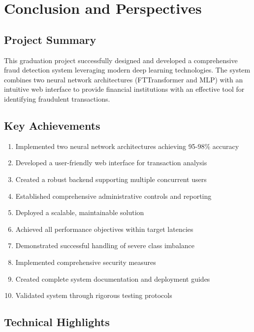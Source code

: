 \documentclass[12pt,a4paper,twoside]{report}
\begin{document}
\chapter*{Conclusion and Perspectives}

\section*{Project Summary}

This graduation project successfully designed and developed a comprehensive fraud detection system leveraging modern deep learning technologies. The system combines two neural network architectures (FTTransformer and MLP) with an intuitive web interface to provide financial institutions with an effective tool for identifying fraudulent transactions.

\section*{Key Achievements}

\begin{enumerate}
    \item Implemented two neural network architectures achieving 95-98\% accuracy
    \item Developed a user-friendly web interface for transaction analysis
    \item Created a robust backend supporting multiple concurrent users
    \item Established comprehensive administrative controls and reporting
    \item Deployed a scalable, maintainable solution
    \item Achieved all performance objectives within target latencies
    \item Demonstrated successful handling of severe class imbalance
    \item Implemented comprehensive security measures
    \item Created complete system documentation and deployment guides
    \item Validated system through rigorous testing protocols
\end{enumerate}

\section*{Technical Highlights}
\end{document}
